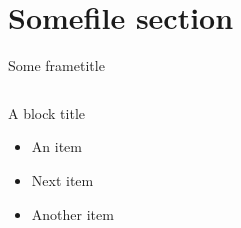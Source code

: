 %
%
%

\section{Somefile section}

\begin{frame}{Some frametitle}
  \begin{columns}[c]
  \begin{block}{A block title}
    \begin{itemize}
      \item An item 
      \item Next item 
      \item Another item
    \end{itemize}
  \end{block} 
  \begin{center}
    
  \end{center}
  \end{columns}
\end{frame}
